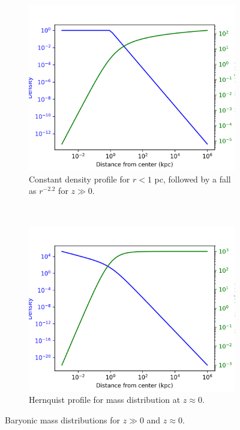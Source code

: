		\begin{figure}[h]
			\centering
			\begin{subfigure}[b]{0.49\textwidth}
				\includegraphics[width=\textwidth]{"../Files/Week 3/gaseous"}
				\caption{Constant density profile for $r < 1$ pc, followed by a fall as $r^{-2.2}$ for $z \gg 0$.}
				\label{fig:gull}
			\end{subfigure}
			~ 
			\begin{subfigure}[b]{0.49\textwidth}
				\includegraphics[width=\textwidth]{"../Files/Week 3/hernquist"}
				\caption{Hernquist profile for mass distribution at $z \approx 0$.}
				\label{fig:tiger}
			\end{subfigure}
			\caption{Baryonic mass distributions for $z \gg 0$ and $z \approx 0$.}
			\label{fig:animals}
		\end{figure}

